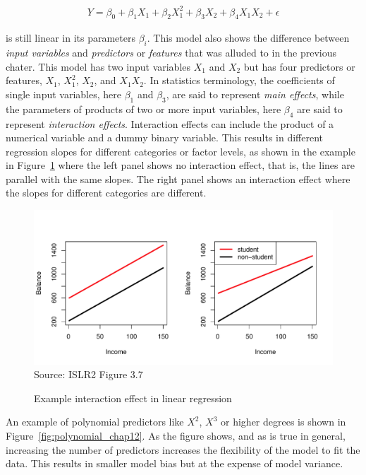 \begin{align*}
Y = \beta_0 + \beta_1 X_1 + \beta_2 X_1^2 + \beta_3 X_2 + \beta_4 X_1 X_2 + \epsilon
\end{align*}

\noindent is still linear in its parameters $\beta_i$. This model also shows the difference between \emph{input variables} and \emph{predictors} or \emph{features} that was alluded to in the previous chater. This model has two input variables $X_1$ and $X_2$ but has four predictors or features, $X_1$, $X_1^2$, $X_2$, and $X_1 X_2$. In statistics terminology, the coefficients of single input variables, here $\beta_1$ and $\beta_3$, are said to represent \emph{main effects}, while the parameters of products of two or more input variables, here $\beta_4$ are said to represent \emph{interaction effects}. Interaction effects can include the product of a numerical variable and a dummy binary variable. This results in different regression slopes for different categories or factor levels, as shown in the example in Figure~\ref{fig:groupinteraction} where the left panel shows no interaction effect, that is, the lines are parallel with the same slopes. The right panel shows an interaction effect where the slopes for different categories are different.

\begin{figure}
\centering
\includegraphics[width=.9\textwidth]{../class11/Figures_Chapters_1-6/Chapter3/3_7.pdf} \\

\scriptsize Source: ISLR2 Figure 3.7
\caption{Example interaction effect in linear regression}
\label{fig:groupinteraction}
\end{figure}

An example of polynomial predictors like $X^2$, $X^3$ or higher degrees is shown in Figure~\ref{fig:polynomial_chap12}. As the figure shows, and as is true in general, increasing the number of predictors increases the flexibility of the model to fit the data. This results in smaller model bias but at the expense of model variance. 

